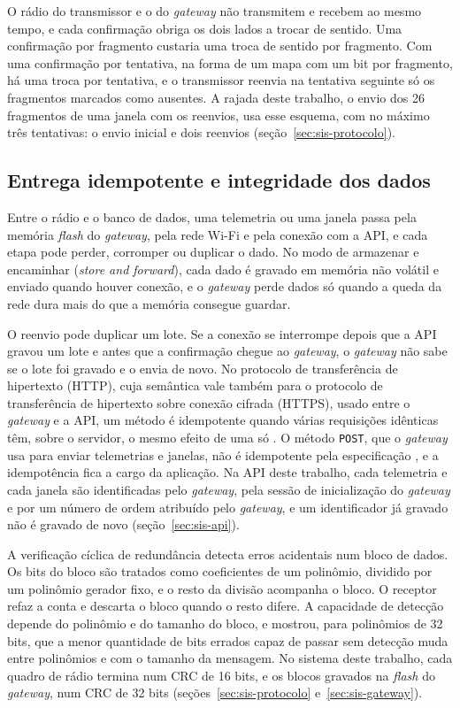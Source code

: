 O rádio do transmissor e o do \textit{gateway} não transmitem e recebem ao mesmo tempo, e cada confirmação obriga os dois lados a trocar de sentido. Uma confirmação por fragmento custaria uma troca de sentido por fragmento. Com uma confirmação por tentativa, na forma de um mapa com um bit por fragmento, há uma troca por tentativa, e o transmissor reenvia na tentativa seguinte só os fragmentos marcados como ausentes. A rajada deste trabalho, o envio dos \num{26} fragmentos de uma janela com os reenvios, usa esse esquema, com no máximo três tentativas: o envio inicial e dois reenvios (seção~\ref{sec:sis-protocolo}).

\subsection{Entrega idempotente e integridade dos dados}\label{sec:fund-entrega}

Entre o rádio e o banco de dados, uma telemetria ou uma janela passa pela memória \textit{flash} do \textit{gateway}, pela rede Wi-Fi e pela conexão com a API, e cada etapa pode perder, corromper ou duplicar o dado. No modo de armazenar e encaminhar (\textit{store and forward}), cada dado é gravado em memória não volátil e enviado quando houver conexão, e o \textit{gateway} perde dados só quando a queda da rede dura mais do que a memória consegue guardar.

O reenvio pode duplicar um lote. Se a conexão se interrompe depois que a API gravou um lote e antes que a confirmação chegue ao \textit{gateway}, o \textit{gateway} não sabe se o lote foi gravado e o envia de novo. No protocolo de transferência de hipertexto (HTTP), cuja semântica vale também para o protocolo de transferência de hipertexto sobre conexão cifrada (HTTPS), usado entre o \textit{gateway} e a API, um método é idempotente quando várias requisições idênticas têm, sobre o servidor, o mesmo efeito de uma só \cite{fielding2022}. O método \texttt{POST}, que o \textit{gateway} usa para enviar telemetrias e janelas, não é idempotente pela especificação \cite{fielding2022}, e a idempotência fica a cargo da aplicação. Na API deste trabalho, cada telemetria e cada janela são identificadas pelo \textit{gateway}, pela sessão de inicialização do \textit{gateway} e por um número de ordem atribuído pelo \textit{gateway}, e um identificador já gravado não é gravado de novo (seção~\ref{sec:sis-api}).

A verificação cíclica de redundância detecta erros acidentais num bloco de dados. Os bits do bloco são tratados como coeficientes de um polinômio, dividido por um polinômio gerador fixo, e o resto da divisão acompanha o bloco. O receptor refaz a conta e descarta o bloco quando o resto difere. A capacidade de detecção depende do polinômio e do tamanho do bloco, e  mostrou, para polinômios de \num{32} bits, que a menor quantidade de bits errados capaz de passar sem detecção muda entre polinômios e com o tamanho da mensagem. No sistema deste trabalho, cada quadro de rádio termina num CRC de \num{16} bits, e os blocos gravados na \textit{flash} do \textit{gateway}, num CRC de \num{32} bits (seções~\ref{sec:sis-protocolo} e~\ref{sec:sis-gateway}).


